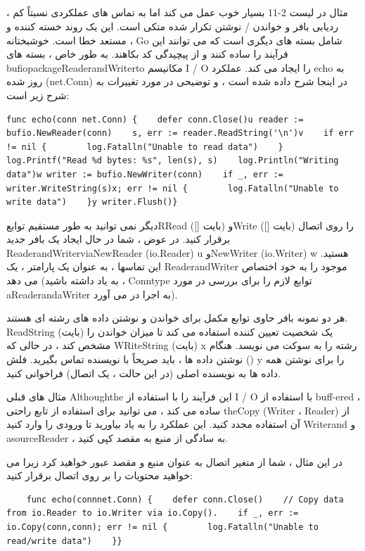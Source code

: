 \documentclass[12pt]{book}
\begin{document}
{\subsection{}
مثال در لیست 2-11 بسیار خوب عمل می کند اما به تماس های عملکردی نسبتاً کم ، ردیابی بافر و خواندن / نوشتن تکرار شده متکی است. این یک روند خسته کننده و مستعد خطا است. خوشبختانه ، Go شامل بسته های دیگری است که می توانند این فرآیند را ساده کنند و از پیچیدگی کد بکاهند. به طور خاص ، بسته های bufiopackageReaderandWriterto مکانیسم I / O را ایجاد می کند. عملکرد echo به روز شده (net.Conn) در اینجا شرح داده شده است ، و توضیحی در مورد تغییرات به شرح زیر است:
\begin{latin}
	\begin{lstlisting}
func echo(conn net.Conn) {    defer conn.Close()u reader := bufio.NewReader(conn)    s, err := reader.ReadString('\n')v    if err != nil {        log.Fatalln("Unable to read data")    }    log.Printf("Read %d bytes: %s", len(s), s)    log.Println("Writing data")w writer := bufio.NewWriter(conn)    if _, err := writer.WriteString(s)x; err != nil {        log.Fatalln("Unable to write data")    }y writer.Flush()}
	\end{lstlisting}
\end{latin}

دیگر نمی توانید به طور مستقیم توابعRRead ([] بایت) وWrite ([] بایت) را روی اتصال برقرار کنید. در عوض ، شما در حال ایجاد یک بافر جدید ReaderandWriterviaNewReader (io.Reader) u وNewWriter (io.Writer) w هستید. این تماسها ، به عنوان یک پارامتر ، یک ReaderandWriter موجود را به خود اختصاص می دهد (به یاد داشته باشید ، Conntype توابع لازم را برای بررسی در مورد aReaderandaWriter به اجرا در می آورد).

هر دو نمونه بافر حاوی توابع مکمل برای خواندن و نوشتن داده های رشته ای هستند. ReadString (بایت) یک شخصیت تعیین کننده استفاده می کند تا میزان خواندن را مشخص کند ، در حالی که WRiteString (بایت) x رشته را به سوکت می نویسد. هنگام نوشتن داده ها ، باید صریحاً با نویسنده تماس بگیرید. فلش () y را برای نوشتن همه داده ها به نویسنده اصلی (در این حالت ، یک اتصال) فراخوانی کنید.

مثال های قبلی Althoughthe این فرآیند را با استفاده از I / O با استفاده از buff-ered ، ساده می کند ، می توانید برای استفاده از تابع راحتی theCopy (Writer ، Reader) از آن استفاده مجدد کنید. این عملکرد را به یاد بیاورید تا ورودی را وارد کنید Writerand و asourceReader ، به سادگی از منبع به مقصد کپی کنید.

در این مثال ، شما از متغیر اتصال به عنوان منبع و مقصد عبور خواهید کرد زیرا می خواهید محتویات را بر روی اتصال برقرار کنید:
\begin{latin}
	\begin{lstlisting}
	func echo(connnet.Conn) {    defer conn.Close()    // Copy data from io.Reader to io.Writer via io.Copy().    if _, err := io.Copy(conn,conn); err != nil {        log.Fatalln("Unable to read/write data")    }}
	\end{lstlisting}
\end{latin}

}
\end{document}
